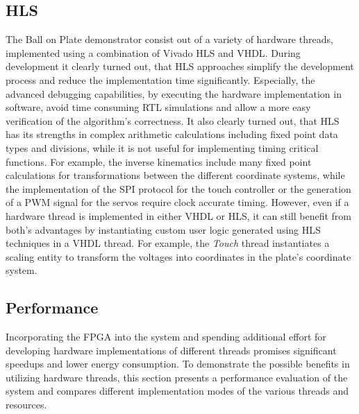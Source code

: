 \subsection{\acl{HLS}}
The Ball on Plate demonstrator consist out of a variety of hardware threads,
implemented using a combination of Vivado HLS and \ac{VHDL}. During
development it clearly turned out, that \ac{HLS} approaches simplify the
development process and reduce the implementation time significantly.
Especially, the advanced debugging capabilities, by executing the hardware
implementation in software, avoid time consuming \ac{RTL} simulations and
allow a more easy verification of the algorithm's correctness. It also clearly
turned out, that \ac{HLS} has its strengths in complex arithmetic calculations
including fixed point data types and divisions, while it is not useful for
implementing timing critical functions. For example, the inverse kinematics
include many fixed point calculations for transformations between the
different coordinate systems, while the implementation of the \ac{SPI}
protocol for the touch controller or the generation of a \ac{PWM} signal for
the servos require clock accurate timing. However, even if a hardware thread
is implemented in either \ac{VHDL} or \ac{HLS}, it can still benefit from
both's advantages by instantiating custom user logic generated using \ac{HLS}
techniques in a \ac{VHDL} thread. For example, the \emph{Touch} thread
instantiates a scaling entity to transform the voltages into coordinates in
the plate's coordinate system.

\subsection{Performance}
Incorporating the \ac{FPGA} into the system and spending additional effort for
developing hardware implementations of different threads promises significant
speedups and lower energy consumption. To demonstrate the possible benefits in
utilizing hardware threads, this section presents a performance evaluation of
the system and compares different implementation modes of the various threads
and resources.

